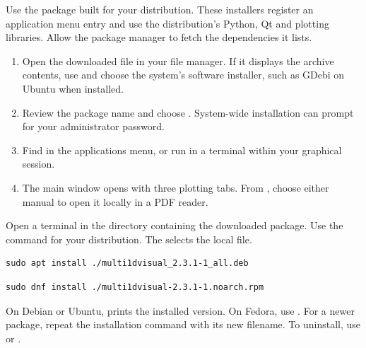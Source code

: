 Use the package built for your distribution. These installers register an application menu entry and use the distribution's Python, Qt and plotting libraries. Allow the package manager to fetch the dependencies it lists.
\begin{enumerate}
\item Open the downloaded file in your file manager. If it displays the archive contents, use  and choose the system's software installer, such as GDebi on Ubuntu when installed.
\item Review the package name  and choose . System-wide installation can prompt for your administrator password.
\item Find  in the applications menu, or run  in a terminal within your graphical session.
\item The main window opens with three plotting tabs. From , choose either manual to open it locally in a PDF reader.
\end{enumerate}
Open a terminal in the directory containing the downloaded package. Use the command for your distribution. The  selects the local file.
\begin{verbatim}
sudo apt install ./multi1dvisual_2.3.1-1_all.deb
\end{verbatim}
\begin{verbatim}
sudo dnf install ./multi1dvisual-2.3.1-1.noarch.rpm
\end{verbatim}
On Debian or Ubuntu,  prints the installed version. On Fedora, use . For a newer package, repeat the installation command with its new filename. To uninstall, use  or .

